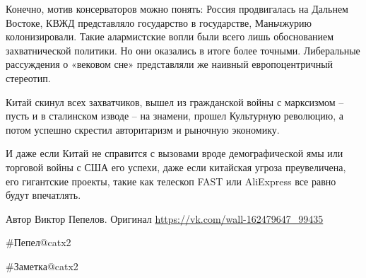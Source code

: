 Конечно, мотив консерваторов можно понять: Россия продвигалась на Дальнем Востоке, КВЖД представляло государство в государстве, Маньчжурию колонизировали. Такие алармистские вопли были всего лишь обоснованием захватнической политики. Но они оказались в итоге более точными. Либеральные рассуждения о «вековом сне» представляли же наивный европоцентричный стереотип.

Китай скинул всех захватчиков, вышел из гражданской войны с марксизмом – пусть и в сталинском изводе – на знамени, прошел Культурную революцию, а потом успешно скрестил авторитаризм и рыночную экономику.

И даже если Китай не справится с вызовами вроде демографической ямы или торговой войны с США его успехи, даже если китайская угроза преувеличена, его гигантские проекты, такие как телескоп FAST или AliExpress все равно будут впечатлять.

Автор Виктор Пепелов. Оригинал \url{https://vk.com/wall-162479647_99435}

\#Пепел@catx2

\#Заметка@catx2
